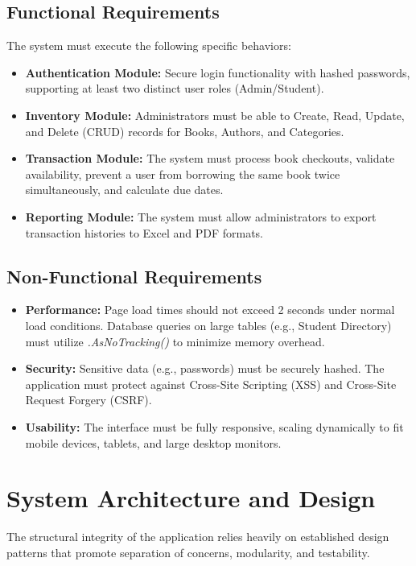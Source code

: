 \documentclass[conference]{IEEEtran}
\begin{document}
\subsection{Functional Requirements}
The system must execute the following specific behaviors:
\begin{itemize}
    \item \textbf{Authentication Module:} Secure login functionality with hashed passwords, supporting at least two distinct user roles (Admin/Student).
    \item \textbf{Inventory Module:} Administrators must be able to Create, Read, Update, and Delete (CRUD) records for Books, Authors, and Categories.
    \item \textbf{Transaction Module:} The system must process book checkouts, validate availability, prevent a user from borrowing the same book twice simultaneously, and calculate due dates.
    \item \textbf{Reporting Module:} The system must allow administrators to export transaction histories to Excel and PDF formats.
\end{itemize}

\subsection{Non-Functional Requirements}
\begin{itemize}
    \item \textbf{Performance:} Page load times should not exceed 2 seconds under normal load conditions. Database queries on large tables (e.g., Student Directory) must utilize \textit{.AsNoTracking()} to minimize memory overhead.
    \item \textbf{Security:} Sensitive data (e.g., passwords) must be securely hashed. The application must protect against Cross-Site Scripting (XSS) and Cross-Site Request Forgery (CSRF).
    \item \textbf{Usability:} The interface must be fully responsive, scaling dynamically to fit mobile devices, tablets, and large desktop monitors.
\end{itemize}

\section{System Architecture and Design}
The structural integrity of the application relies heavily on established design patterns that promote separation of concerns, modularity, and testability.
\end{document}
